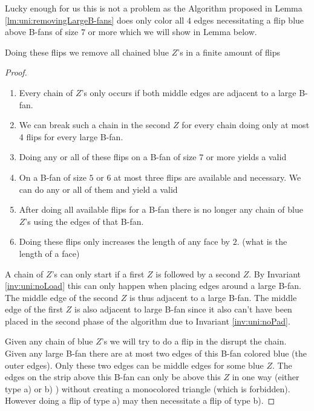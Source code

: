 Lucky enough for us this is not a problem as the Algorithm proposed in Lemma \ref{lm:uni:removingLargeB-fans} does only color all $4$ edges necessitating a flip blue above B-fans of size $7$ or more which we will show in Lemma below.



\begin{lemma}
  \label{lm:uni:flips}
  Doing these flips we remove all chained blue $Z$'s in a finite amount of flips
\end{lemma}

\begin{proof}
  \begin{enumerate}
    \item Every chain of $Z$'s only occurs if both middle edges are adjacent to a large B-fan.
    \item We can break such a chain in the second $Z$ for every chain doing only at most 4 flips for every large B-fan.
    \item Doing any or all of these flips on a B-fan of size $7$ or more yields a valid \rel
    \item On a B-fan of size $5$ or $6$ at most three flips are available and necessary. We can do any or all of them and yield a valid \rel
    \item After doing all available flips for a B-fan there is no longer any chain of blue $Z$'s using the edges of that B-fan.
    \item Doing these flips only increases the length of any face by $2$. (what is the length of a face)
  \end{enumerate}

  A chain of $Z$'s can only start if a first $Z$ is followed by a second $Z$. By Invariant \ref{inv:uni:noLoad} this can only happen when placing edges around a large B-fan. The middle edge of the second $Z$ is thus adjacent to a large B-fan. The middle edge of the first $Z$ is also adjacent to large B-fan since it also can't have been placed in the second phase of the algorithm due to Invariant \ref{inv:uni:noPad}.

  Given any chain of blue $Z$'s we will try to do a flip in the disrupt the chain. Given any large B-fan there are at most two edges of this B-fan colored blue (the outer edges). Only these two edges can be middle edges for some blue $Z$. The edges on the strip above this B-fan can only be above this $Z$ in one way (either type a) or b) ) without creating a monocolored triangle (which is forbidden). However doing a flip of type a) may then necessitate a flip of type b).


\end{proof}
